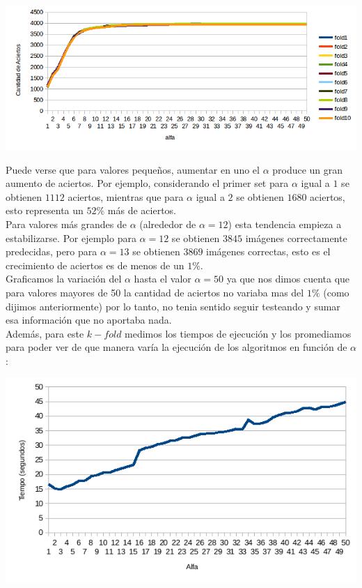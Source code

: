 \begin{center}
\includegraphics[scale=0.6]{nuevosResultados/pca/alfa/1.png}
\end{center}

Puede verse que para valores pequeños, aumentar en uno el $\alpha$ produce un gran aumento de aciertos. Por ejemplo, considerando el primer set para $\alpha$ igual a $1$ se obtienen $1112$ aciertos, mientras que para $\alpha$ igual a $2$ se obtienen $1680$ aciertos, esto representa un $52\%$ más de aciertos.
\\
Para valores más grandes de $\alpha$ (alrededor de $\alpha = 12$) esta tendencia empieza a estabilizarse. Por ejemplo para $\alpha = 12$ se obtienen $3845$ imágenes correctamente predecidas, pero para $\alpha = 13$ se obtienen $3869$ imágenes correctas, esto es el crecimiento de aciertos es de menos de un $1\%$.
\\
Graficamos la variación del $\alpha$ hasta el valor $\alpha = 50$ ya que nos dimos cuenta que para valores mayores de 50 la cantidad de aciertos no variaba mas del $1\%$ (como dijimos anteriormente) por lo tanto, no tenia sentido seguir testeando y sumar esa información que no aportaba nada.  
\\
Además, para este $k-fold$ medimos los tiempos de ejecución y los promediamos para poder ver de que manera varía la ejecución de los algoritmos en función de $\alpha$:

\begin{center}
\includegraphics[scale=0.6]{nuevosResultados/pca/alfa/temp.png}
\end{center}


